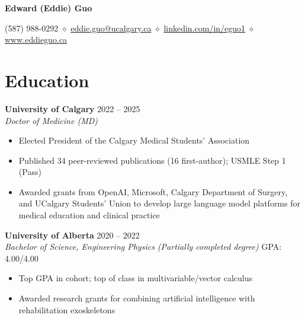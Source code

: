 \documentclass{article}
\begin{document}
\thispagestyle{plain}
\begin{center}
\LARGE \textbf{\textcolor{my_colour}{Edward (Eddie) Guo}} \vspace{.2em}

\normalfont \normalsize
(587) 988-0292
    \hspace{.15em} $\diamond$ \hspace{.15em}
\href{mailto:eddie.guo@ucalgary.ca}{eddie.guo@ucalgary.ca}
    \hspace{.15em} $\diamond$ \hspace{.15em}
\href{https://www.linkedin.com/in/eguo1}{linkedin.com/in/eguo1}
    \hspace{.15em} $\diamond$ \hspace{.15em}
\href{https://eddieguo.ca}{www.eddieguo.ca}
\end{center}

\vspace{-1em}


\section*{\textcolor{my_colour}{Education}}
\vspace{-.25em} \hrulefill \vspace{.25em}

\textbf{University of Calgary} \hfill 2022 -- 2025 \\
\textit{Doctor of Medicine (MD)}
\begin{itemize}
    \item Elected President of the Calgary Medical Students' Association
    \item Published 34 peer-reviewed publications (16 first-author); USMLE Step 1 (Pass)
    \item Awarded grants from OpenAI, Microsoft, Calgary Department of Surgery, and UCalgary Students' Union to develop large language model platforms for medical education and clinical practice
\end{itemize} \vspace{1em}

\textbf{University of Alberta} \hfill 2020 -- 2022 \\
\textit{Bachelor of Science, Engineering Physics (Partially completed degree)} \hfill GPA: 4.00/4.00
\begin{itemize}
    \item Top GPA in cohort; top of class in multivariable/vector calculus
    \item Awarded research grants for combining artificial intelligence with rehabilitation exoskeletons
\end{itemize} \vspace{1em}
\end{document}
